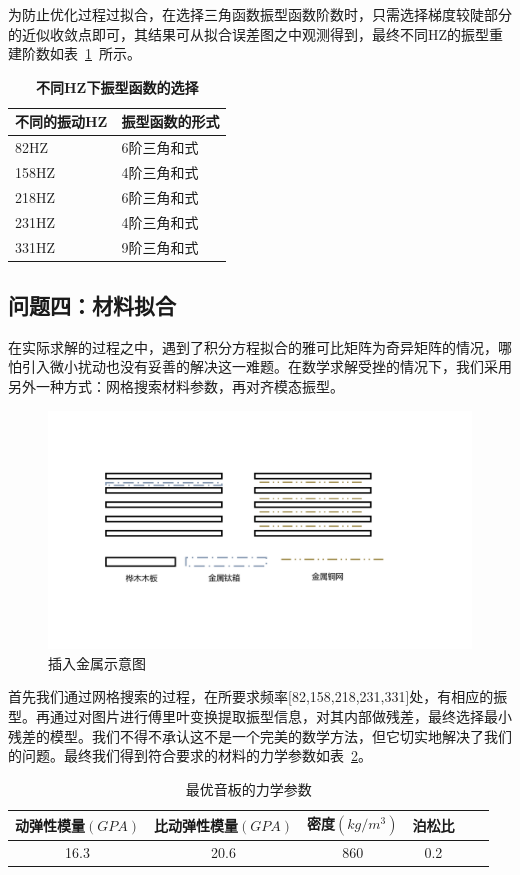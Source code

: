 \documentclass[withoutpreface,bwprint]{cumcmthesis} %
\begin{document}
为防止优化过程过拟合，在选择三角函数振型函数阶数时，只需选择梯度较陡部分的近似收敛点即可，其结果可从拟合误差图之中观测得到，最终不同HZ的振型重建阶数如表~\ref{table-HZ}~所示。
\begin{table}[H]
	\caption{\textbf{不同HZ下振型函数的选择}}%
	\centering
	\begin{tabular}{ll}%
		\hline %
		不同的振动HZ   &  振型函数的形式  \\
		\hline %
		82HZ&6阶三角和式\\
  	158HZ&4阶三角和式\\
		218HZ&6阶三角和式\\
		231HZ&4阶三角和式\\
        331HZ&9阶三角和式\\
		\hline %
	\end{tabular}\label{table-HZ}
\end{table}
\subsection{问题四：材料拟合}
在实际求解的过程之中，遇到了积分方程拟合的雅可比矩阵为奇异矩阵的情况，哪怕引入微小扰动也没有妥善的解决这一难题。在数学求解受挫的情况下，我们采用另外一种方式：网格搜索材料参数，再对齐模态振型。
\begin{figure}
    \centering
    \includegraphics[width=0.5\linewidth]{CUMCMThesis-master/figures/tongwang.pdf}
    \caption{插入金属示意图}
    \label{tongwang}
\end{figure}

首先我们通过网格搜索的过程，在所要求频率[82,158,218,231,331]处，有相应的振型。再通过对图片进行傅里叶变换提取振型信息，对其内部做残差，最终选择最小残差的模型。我们不得不承认这不是一个完美的数学方法，但它切实地解决了我们的问题。最终我们得到符合要求的材料的力学参数如表~\ref{yinbancanshu}。
\begin{table}[htb]
\centering
\caption{最优音板的力学参数}
\label{table1}
\begin{tabular}{@{}cccccc@{}}
\toprule
\textbf{动弹性模量$(GPA)$}&\textbf{比动弹性模量$(GPA)$} & \textbf{密度$(kg/m^3)$} & \textbf{泊松比} \\
\midrule
16.3&20.6&860&0.2 \\
\bottomrule
\end{tabular}\label{yinbancanshu}
\end{table}
\end{document}

